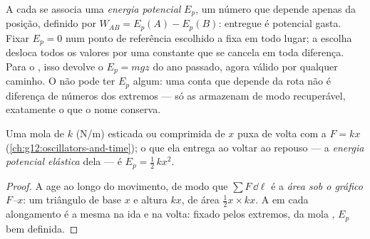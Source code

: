 \begin{definition}\label{def:g12:work-and-energy:ep}
A cada  se associa uma \emph{energia potencial} $E_p$, um número que depende apenas da
posição, definido por $W_{AB} = E_p(A) - E_p(B)$:  entregue é  potencial
gasta. Fixar $E_p = 0$ num ponto de referência escolhido a fixa em todo lugar; a
escolha desloca todos os valores por uma constante que se cancela em toda diferença.
Para o , isso devolve o $E_p = mgz$ do ano passado, agora válido por qualquer
caminho. O  não pode ter $E_p$ algum: uma conta que depende da rota não é
diferença de números dos extremos --- só as  armazenam de modo
recuperável, exatamente o que o nome conserva.
\end{definition}

\begin{proposition}\label{prop:g12:work-and-energy:elastic}
Uma mola de  $k$ (\unit{N/m}) esticada ou comprimida de $x$ puxa de
volta com a  $F = kx$ (\cref{ch:g12:oscillators-and-time}); o  que ela
entrega ao voltar ao repouso --- a \emph{energia potencial elástica} dela --- é $E_p = \tfrac12\, k x^2$.
\end{proposition}

\begin{proof}
A  age ao longo do movimento, de modo que $\sum F\,\dd\ell$ é a
\emph{área sob o gráfico $F$--$x$}: um triângulo de base $x$ e altura $kx$, de área
$\tfrac12 x \times kx$. A  em cada alongamento é a mesma na ida e na volta:
 fixado pelos extremos,  da mola , $E_p$ bem definida.
\end{proof}

